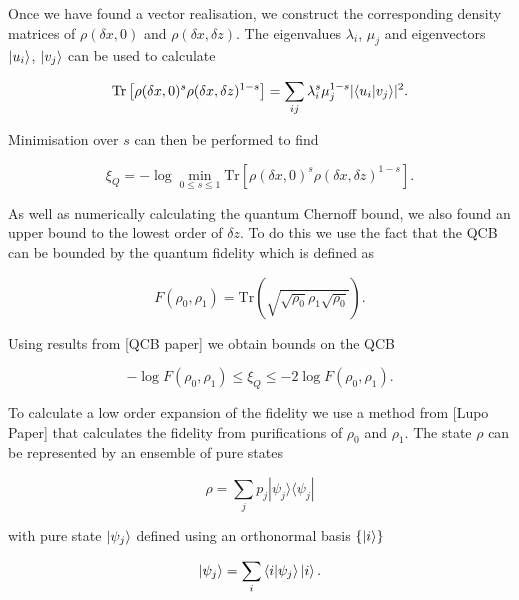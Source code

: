 \documentclass{article}
\DeclarePairedDelimiter\abs{\lvert}{\rvert}%
\newcommand{\ketbra}[2]{|#1\rangle\langle#2|}
\begin{document}
Once we have found a vector realisation, we construct the corresponding density matrices of $\rho(\delta x,0) $ and $\rho(\delta x, \delta z)$.
The eigenvalues $\lambda_i$, $\mu_j$ and eigenvectors $\ket{u_i}$, $\ket{v_j}$ can be used to calculate

\begin{equation}
    \mathrm{Tr}\left[\rho(\delta x,0)^s \rho(\delta x, \delta z)^{1-s} \right] = \sum_{ij} \lambda_i^s \mu_j^{1-s} \abs{\braket{u_i|v_j}}^2.
\end{equation}

Minimisation over $s$ can then be performed to find

\begin{equation}
\xi_Q = -\log \min_{0 \leq s \leq 1} \mathrm{Tr} \left[ \rho(\delta x,0)^s \rho(\delta x, \delta z)^{1-s} \right].
\end{equation}




As well as numerically calculating the quantum Chernoff bound, we also found an upper bound to the lowest order of $\delta z$. To do this we use the fact that the QCB can be bounded by the quantum fidelity which is defined as

\begin{equation}
F(\rho_0, \rho_1) = \mathrm{Tr}\left( \sqrt{\sqrt{\rho_0} \rho_1 \sqrt{\rho_0}}\right).
\end{equation}

Using results from [QCB paper] we obtain bounds on the QCB

\begin{equation}
- \log F(\rho_0, \rho_1)  \leq \xi_Q \leq - 2 \log F(\rho_0, \rho_1).
\end{equation}

To calculate a low order expansion of the fidelity we use a method from [Lupo Paper] that calculates the fidelity from purifications of $\rho_0$ and $\rho_1$.
The state $\rho$ can be represented by an ensemble of pure states

\begin{equation}
\rho = \sum_j p_j \ketbra{\psi_j}{\psi_j}
\end{equation}

with pure state $\ket{\psi_j}$ defined using an orthonormal basis $\{\ket{i}\}$

\begin{equation}
\ket{\psi_j} = \sum_i \braket{i|\psi_j} \ket{i}.
\end{equation}
\end{document}
